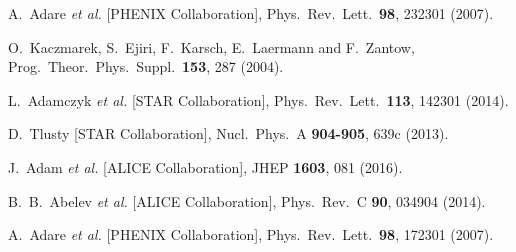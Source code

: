 \documentclass[twocolumn,aps,superscriptaddress,showpacs,nofootinbib,floatfix]{revtex4}
\begin{document}
\begin{thebibliography}{99}
  A.~Adare {\it et al.} [PHENIX Collaboration],
  Phys.\ Rev.\ Lett.\  {\bf 98}, 232301 (2007).

  O.~Kaczmarek, S.~Ejiri, F.~Karsch, E.~Laermann and F.~Zantow,
  Prog.\ Theor.\ Phys.\ Suppl.\  {\bf 153}, 287 (2004).

  L.~Adamczyk {\it et al.}  [STAR Collaboration],
  Phys.\ Rev.\ Lett.\  {\bf 113},  142301 (2014).

  D.~Tlusty [STAR Collaboration],
  Nucl.\ Phys.\ A {\bf 904-905}, 639c (2013).

  J.~Adam {\it et al.} [ALICE Collaboration],
  JHEP {\bf 1603}, 081 (2016).

  B.~B.~Abelev {\it et al.} [ALICE Collaboration],
  Phys.\ Rev.\ C {\bf 90}, 034904 (2014).

  A.~Adare {\it et al.} [PHENIX Collaboration],
  Phys.\ Rev.\ Lett.\  {\bf 98}, 172301 (2007).


\end{thebibliography}
\end{document}
